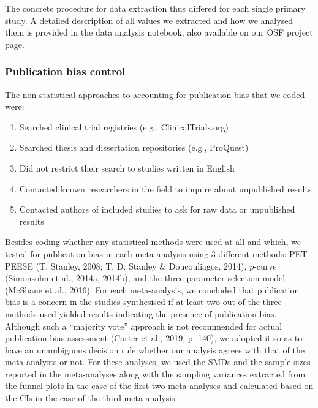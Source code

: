\documentclass[
  man,floatsintext]{apa6}
\providecommand{\tightlist}{%
  \setlength{\itemsep}{0pt}\setlength{\parskip}{0pt}}
\begin{document}
The concrete procedure for data extraction thus differed for each single primary study. A detailed description of all values we extracted and how we analysed them is provided in the data analysis notebook, also available on our OSF project page.

\hypertarget{publication-bias-control-1}{%
\subsubsection{Publication bias control}\label{publication-bias-control-1}}

The non-statistical approaches to accounting for publication bias that we coded were:

\begin{enumerate}
\def\labelenumi{\arabic{enumi}.}
\tightlist
\item
  Searched clinical trial registries (e.g., ClinicalTrials.org)
\item
  Searched thesis and dissertation repositories (e.g., ProQuest)
\item
  Did not restrict their search to studies written in English
\item
  Contacted known researchers in the field to inquire about unpublished results
\item
  Contacted authors of included studies to ask for raw data or unpublished results
\end{enumerate}

Besides coding whether any statistical methods were used at all and which, we tested for publication bias in each meta-analysis using 3 different methods: PET-PEESE (T. Stanley, 2008; T. D. Stanley \& Doucouliagos, 2014), \(p\)-curve (Simonsohn et al., 2014a, 2014b), and the three-parameter selection model (McShane et al., 2016). For each meta-analysis, we concluded that publication bias is a concern in the studies synthesised if at least two out of the three methods used yielded results indicating the presence of publication bias. Although such a ``majority vote'' approach is not recommended for actual publication bias assessment (Carter et al., 2019, p. 140), we adopted it so as to have an unambiguous decision rule whether our analysis agrees with that of the meta-analysts or not. For these analyses, we used the SMDs and the sample sizes reported in the meta-analyses along with the sampling variances extracted from the funnel plots in the case of the first two meta-analyses and calculated based on the CIs in the case of the third meta-analysis.
\end{document}
